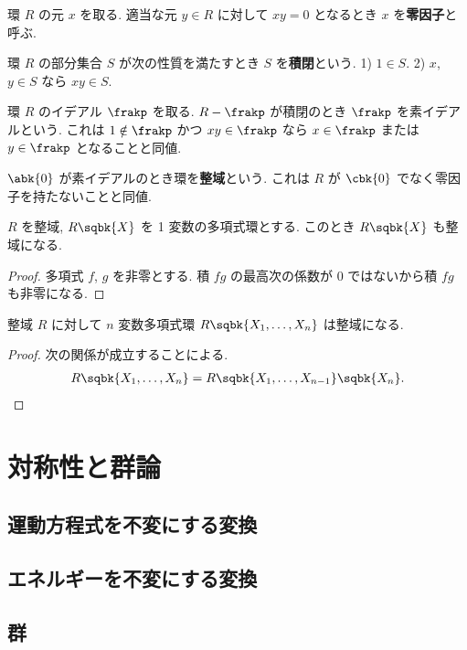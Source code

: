 \documentclass[openany, a4paper, oneside]{jsbook}
\begin{document}
\begin{defn}
 環 $R$ の元 $x$ を取る.
 適当な元 $y \in R$ に対して $xy = 0$ となるとき $x$ を\textbf{零因子}と呼ぶ.
\end{defn}
\begin{defn}
 環 $R$ の部分集合 $S$ が次の性質を満たすとき $S$ を\textbf{積閉}という.
 1) $1 \in S$.
 2) $x$, $y \in S$ なら $xy \in S$.
\end{defn}
\begin{defn}
 環 $R$ のイデアル $\frakp$ を取る.
 $R - \frakp$ が積閉のとき $\frakp$ を素イデアルという.
 これは $1 \notin \frakp$ かつ $xy \in \frakp$ なら $x \in \frakp$ または $y \in \frakp$ となることと同値.
\end{defn}
\begin{defn}
 $\abk{0}$ が素イデアルのとき環を\textbf{整域}という.
 これは $R$ が $\cbk{0}$ でなく零因子を持たないことと同値.
\end{defn}
\begin{thm}
 $R$ を整域, $R \sqbk{X}$ を 1 変数の多項式環とする.
 このとき $R \sqbk{X}$ も整域になる.
\end{thm}
\begin{proof}
多項式 $f$, $g$ を非零とする.
積 $fg$ の最高次の係数が $0$ ではないから積 $fg$ も非零になる.
\end{proof}
\begin{cor}
 整域 $R$ に対して $n$ 変数多項式環 $R \sqbk{X_1, \dots, X_n}$ は整域になる.
\end{cor}
\begin{proof}
次の関係が成立することによる.
\begin{align}
 R \sqbk{X_1, \dots, X_n}
 =
 R \sqbk{X_1, \dots, X_{n-1}} \sqbk{X_n}.
\end{align}
\end{proof}
\chapter{対称性と群論}

\section{運動方程式を不変にする変換}

\section{エネルギーを不変にする変換}

\section{群}
\end{document}

